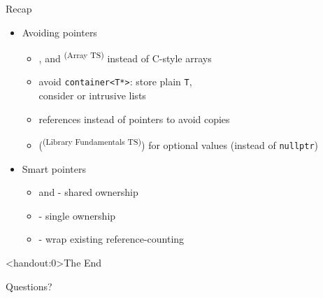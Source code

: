 	\begin{frame}{Recap}
		\begin{itemize}
			\item Avoiding pointers
			\begin{itemize}
				\item {},  and \textsuperscript{(Array TS)} instead of C-style arrays
				\item avoid \lstinline|container<T*>|: store plain \lstinline|T|, \\
					consider  or intrusive lists
				\item references instead of pointers to avoid copies
				\item {} (\textsuperscript{(Library Fundamentals TS)}) for optional values (instead of \lstinline|nullptr|)
			\end{itemize}
			\emptyline
			\item Smart pointers
			\begin{itemize}
				\item {} and  - shared ownership
				\item {} - single ownership
				\item {} - wrap existing reference-counting
			\end{itemize}
		\end{itemize}
	\end{frame}
	
	\begin{frame}<handout:0>{The End}
		\begin{center}
			
			\emptyline
			{\LARGE Questions?}
			
			\emptyline[10]
			
		\end{center}
	\end{frame}


